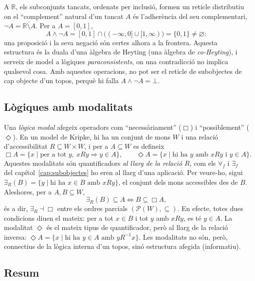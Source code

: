 \begin{exemple}
A $\mathbb R$, els subconjunts tancats, ordenats per inclusió, formen un reticle distributiu on el \enquote{complement} natural d'un tancat $A$ és l'adherència del seu complementari, $\neg A=\overline{\mathbb R\setminus A}$. Per a $A=[0,1]$,
\[
A\wedge\neg A=[0,1]\cap\bigl((-\infty,0]\cup[1,\infty)\bigr)=\{0,1\}\neq\varnothing:
\]
una proposició i la seva negació són certes alhora a la frontera. Aquesta estructura és la duala d'una àlgebra de Heyting (una àlgebra de \emph{co-Heyting}), i serveix de model a lògiques \emph{paraconsistents}, on una contradicció no implica qualsevol cosa. Amb aquestes operacions, no pot ser el reticle de subobjectes de cap objecte d'un topos, perquè hi falla $A\wedge\neg A=\bot$.
\end{exemple}

\subsection{Lògiques amb modalitats}

Una \emph{lògica modal} afegeix operadors com \enquote{necessàriament} ($\Box$) i \enquote{possiblement} ($\Diamond$). En un model de Kripke, hi ha un conjunt de mons $W$ i una relació d'accessibilitat $R\subseteq W\times W$, i per a $A\subseteq W$ es defineix
\[
\Box A=\{x\mid \text{per a tot } y,\ xRy\Rightarrow y\in A\},
\qquad
\Diamond A=\{x\mid \text{hi ha } y \text{ amb } xRy \text{ i } y\in A\}.
\]
Aquestes modalitats són quantificadors \emph{al llarg de la relació} $R$, com els $\forall_f$ i $\exists_f$ del capítol~\ref{cap:subobjectes} ho eren al llarg d'una aplicació. Per veure-ho, sigui $\exists_R(B)=\{y\mid \text{hi ha } x\in B \text{ amb } xRy\}$, el conjunt dels mons accessibles des de $B$. Aleshores, per a $A,B\subseteq W$,
\[
\exists_R(B)\subseteq A\iff B\subseteq\Box A,
\]
és a dir, $\exists_R\dashv\Box$ entre els ordres parcials $(\mathcal P(W),\subseteq)$. En efecte, totes dues condicions diuen el mateix: per a tot $x\in B$ i tot $y$ amb $xRy$, es té $y\in A$. La modalitat $\Diamond$ és el mateix tipus de quantificador, però al llarg de la relació inversa: $\Diamond A=\{x\mid\text{hi ha } y\in A \text{ amb } yR^{-1}x\}$. Les modalitats no són, però, connectius de la lògica interna d'un topos, sinó estructura afegida (informatiu).

\subsection{Resum}

